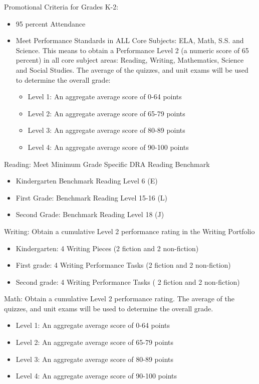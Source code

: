 \documentclass[12pt,letterpaper]{article}
\begin{document}
Promotional Criteria for Grades K-2:
\begin{itemize}
\item 95 percent Attendance
\pagebreak
\vspace*{1.5cm}
\item Meet Performance Standards in ALL Core Subjects: ELA, Math, S.S. and Science. This means to
obtain a Performance Level 2 (a numeric score of 65 percent) in all core subject areas: Reading,
Writing, Mathematics, Science and Social Studies. The average of the quizzes, and unit exams will
be used to determine the overall grade:
	\begin{itemize}
	\item Level 1: An aggregate average score of 0-64 points
	\item Level 2: An aggregate average score of 65-79 points
	\item Level 3: An aggregate average score of 80-89 points
	\item Level 4: An aggregate average score of 90-100 points
	\end{itemize}
\end{itemize}	
Reading: Meet Minimum Grade Specific DRA Reading Benchmark
\begin{itemize}
\item Kindergarten Benchmark Reading Level 6 (E)
\item First Grade: Benchmark Reading Level 15-16 (L)
\item Second Grade: Benchmark Reading Level 18 (J)
\end{itemize}
Writing: Obtain a cumulative Level 2 performance rating in the Writing Portfolio
\begin{itemize}
\item Kindergarten: 4 Writing Pieces (2 fiction and 2 non-fiction)
\item First grade: 4 Writing Performance Tasks (2 fiction and 2 non-fiction)
\item Second grade: 4 Writing Performance Tasks ( 2 fiction and 2 non-fiction)
\end{itemize}

Math: Obtain a cumulative Level 2 performance rating. The average of the quizzes, and unit exams will be used to determine the overall grade.
\begin{itemize}
\item Level 1: An aggregate average score of 0-64 points
\item Level 2: An aggregate average score of 65-79 points
\item Level 3: An aggregate average score of 80-89 points
\item Level 4: An aggregate average score of 90-100 points
\end{itemize}
\end{document}
